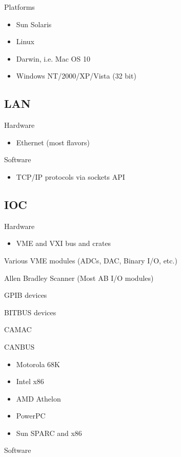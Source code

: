 Platforms

\begin{itemize}\item Sun Solaris

\item Linux

\item Darwin, i.e. Mac OS 10

\item Windows NT/2000/XP/Vista (32 bit)

\end{itemize}\subsection{LAN}

Hardware

\begin{itemize}\item Ethernet (most flavors)

\end{itemize}Software

\begin{itemize}\item TCP/IP protocols via sockets API

\end{itemize}\subsection{IOC}

Hardware

\begin{itemize}\item VME and VXI bus and crates

\end{itemize}Various VME modules (ADCs, DAC, Binary I/O, etc.)

Allen Bradley Scanner (Most AB I/O modules)

GPIB devices

BITBUS devices

CAMAC

CANBUS

\begin{itemize}\item Motorola 68K

\item Intel x86

\item AMD Athelon

\item PowerPC

\item Sun SPARC and x86

\end{itemize}Software

